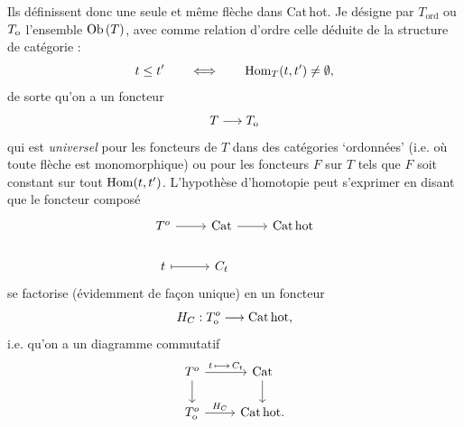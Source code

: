 Ils définissent donc une seule et même flèche dans Cat\,hot. Je désigne par $T_{\mathrm{ord}}$ ou $T_{\mathrm{o}}$ l'ensemble $\mathrm{Ob}\,(T)$, avec comme relation d'ordre celle déduite de la structure de catégorie :
\[
t \leq t' \qquad\Longleftrightarrow\qquad \mathrm{Hom}_{T}(t,t') \neq \emptyset,
\]
de sorte qu'on a un foncteur
\[
T \longrightarrow T_{\mathrm{o}}
\]
qui est \textit{universel} pour les foncteurs de $T$ dans des catégories ‘ordonnées' (i.e. où toute flèche est monomorphique) ou pour les foncteurs $F$ sur $T$ tels que $F$ soit constant sur tout $\mathrm{Hom}(t,t')$. L'hypothèse d'homotopie peut s'exprimer en disant que le foncteur composé
\[
\begin{tikzcd}
T^{o} \arrow[r] & \Cat \arrow[r] & \Cathot \\
t \arrow[r, mapsto] & C_{t} &
\end{tikzcd}
\]
se factorise (évidemment de façon unique) en un foncteur
\[
H_{C} : T_{\mathrm{o}}^{o} \longrightarrow \mathrm{Cat\,hot},
\]
i.e. qu'on a un diagramme commutatif
\[
\begin{tikzcd}
T^{o} \arrow[r, "t\,\longmapsto\, C_{t}"] \arrow[d] & \Cat \arrow[d] \\
\To^{o} \arrow[r, "H_{C}"] & \Cathot.
\end{tikzcd}
\]

